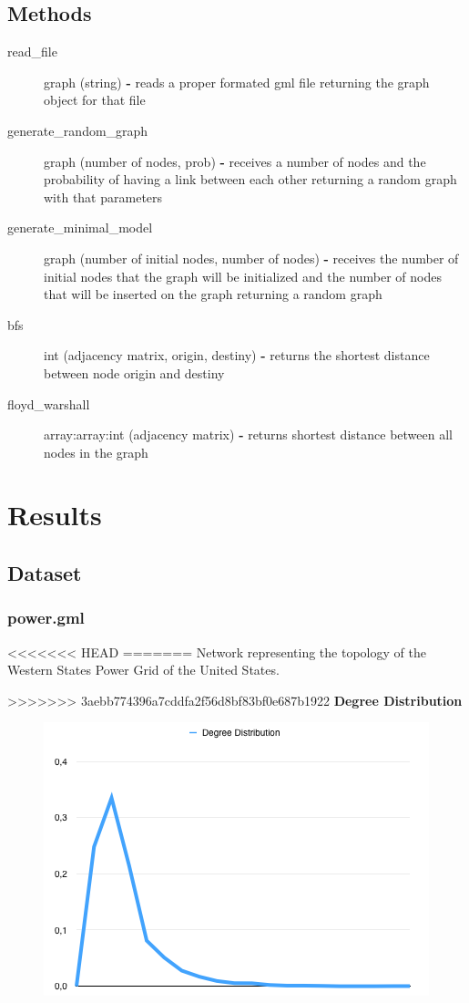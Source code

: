 \documentclass[a4paper,titlepage,11pt]{article}
\begin{document}
\subsection*{Methods}
\begin{description}
\item [read\_file] graph (string) \textbf{-} reads a proper formated gml file returning the graph object for that file
\item [generate\_random\_graph] graph (number of nodes, prob) \textbf{-} receives a number of nodes and the probability of
                                                            having a link between each other returning a random graph with that parameters
\item [generate\_minimal\_model] graph (number of initial nodes, number of nodes) \textbf{-} receives the number of initial nodes that the 																graph will be initialized and the number of nodes that will be inserted on 																 the graph returning a random graph
\item [bfs] int (adjacency matrix, origin, destiny) \textbf{-} returns the shortest distance between node origin and destiny
\item [floyd\_warshall] array:array:int (adjacency matrix) \textbf{-} returns shortest distance between all nodes in the graph

\end{description}

\section{Results}
\subsection{Dataset}
\subsubsection{power.gml}
<<<<<<< HEAD
=======
	Network representing the topology of the Western States Power Grid of the United States.

>>>>>>> 3aebb774396a7cddfa2f56d8bf83bf0e687b1922
\textbf{Degree Distribution}

\begin{figure}[h]
    \centering
    \includegraphics[scale=0.50]{img/dd-dataset.png}
\end{figure}
\end{document}

